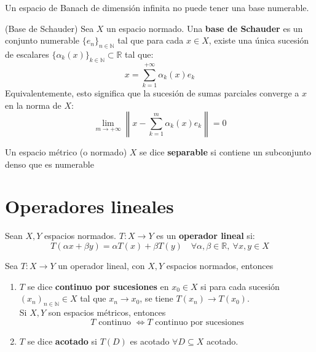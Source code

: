 \documentclass[12pt]{book}
\newcommand{\tbf}{\textbf}
\newcommand{\N}{\mathbb{N}}
\begin{document}
\begin{coro}
    Un espacio de Banach de dimensión infinita no puede tener una base numerable.
\end{coro}

\begin{definicion}(Base de Schauder)
    Sea $X$ un espacio normado. Una \textbf{base de Schauder} es un conjunto numerable $\{e_n\}_{n\in \N}$ tal que para cada $x \in X$, existe una única sucesión de escalares $\{\alpha_k(x)\}_{k\in \N} \subset \mathbb{R}$ tal que:
    \begin{equation}\label{eq:base-schauder}
        x = \sum_{k=1}^{+\infty} \alpha_k(x)e_k 
    \end{equation}
    Equivalentemente, esto significa que la sucesión de sumas parciales converge a $x$ en la norma de $X$:
    \begin{equation}\label{eq:base-schauder2}
        \lim_{m \to +\infty} \left\|x - \sum_{k=1}^{m} \alpha_k(x)e_k\right\| = 0 
    \end{equation}
\end{definicion}

\begin{definicion}
    Un espacio métrico (o normado) $X$ se dice \tbf{separable} si contiene un subconjunto denso que es numerable
\end{definicion}

\section{Operadores lineales}

\begin{definicion}
    Sean $X, Y$ espacios normados. $T: X \longrightarrow Y$ es un \textbf{operador lineal} si:
    \begin{equation*}
        T(\alpha x + \beta y) = \alpha T(x) + \beta T(y) \quad \forall \alpha, \beta \in \mathbb{R}, \ \forall x, y \in X
    \end{equation*}
\end{definicion}

\begin{definicion}
Sea $T: X \longrightarrow Y$ un operador lineal, con $X, Y$ espacios normados, entonces
    \begin{enumerate}
        \item[i)] $T$ se dice \textbf{continuo por sucesiones} en $x_0 \in X$ si para cada sucesión $(x_n)_{n\in \N} \in X$ tal que $x_n \longrightarrow x_0$, se tiene $T(x_n) \longrightarrow T(x_0)$. \\
        \noindent
        Si $X, Y$ son espacios métricos, entonces
        \begin{equation*}
            T \text{ continuo } \iff T \text{ continuo por sucesiones}
        \end{equation*}
        \item[iii)] $T$ se dice \textbf{acotado} si $T(D)$ es acotado $\forall D \subseteq X$ acotado.
    \end{enumerate}
\end{definicion}
\end{document}
